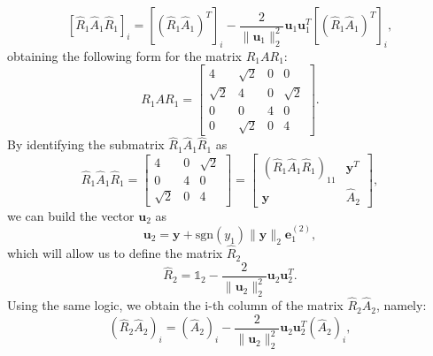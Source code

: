 \documentclass[a4paper,11pt]{article}
\begin{document}
 \begin{equation}\label{key}
	\left[ \hat{R}_1 \hat{A}_1 \hat{R}_1 \right]_i = 	\left[ (\hat{R}_1 \hat{A}_1 )^T \right]_i  - \frac{2}{\lVert \textbf{u}_1\rVert_2^2} \textbf{u}_1 \textbf{u}_1^T	\left[ (\hat{R}_1 \hat{A}_1 )^T \right]_i ,
\end{equation}
obtaining the following form for the matrix $R_1 A R_1 $:
\begin{equation}\label{key}
		R_1 A R_1 = \left[ \begin{array}{cccc}
		4 & \sqrt{2} & 0 & 0 \\
		\sqrt{2} & 4 & 0 & \sqrt{2} \\
		0 & 0 & 4 & 0 \\
		0 & \sqrt{2} & 0 & 4
	\end{array} \right] .
\end{equation}
By identifying the submatrix $	\hat{R}_1 \hat{A}_1 \hat{R}_1$ as
\begin{equation}\label{key}
	\hat{R}_1 \hat{A}_1 \hat{R}_1 = \left[ \begin{array}{ccc}
		4 & 0 & \sqrt{2} \\
		0 & 4 & 0 \\
		\sqrt{2} & 0 & 4
	\end{array} \right]  =  \left[ \begin{array}{cc}
	(\hat{R}_1 \hat{A}_1 \hat{R}_1)_{11}& \textbf{y}^T \\
	\textbf{y} & \hat{A}_2 
\end{array} \right],
\end{equation}	
we can build the vector $\textbf{u}_2 $ as
\begin{equation}\label{key}
	\textbf{u}_2 = \textbf{y} + \text{sgn}(y_1) \lVert \textbf{y}\rVert_2\textbf{e}_1^{(2)},
\end{equation}	
which will allow us to define the matrix $\hat{R}_2$
\begin{equation}\label{key}
	\hat{R}_2 = \mathbb{1}_2 - \frac{2}{\lVert \textbf{u}_2\rVert_2^2} \textbf{u}_2 \textbf{u}_2^T.
\end{equation}
Using the same logic, we obtain the i-th column of the matrix $\hat{R}_2\hat{A}_2$, namely:
\begin{equation}\label{key}
	( \hat{R}_2\hat{A}_2)_i = (\hat{A}_2)_i - \frac{2}{\lVert \textbf{u}_2\rVert_2^2} \textbf{u}_2 \textbf{u}_2^T(\hat{A}_2)_i,
\end{equation}
\end{document}
